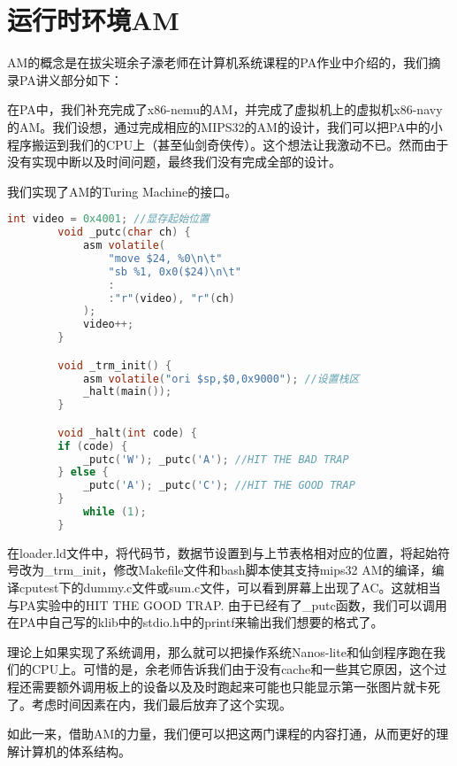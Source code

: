 \section{运行时环境AM}
    AM的概念是在拔尖班余子濠老师在计算机系统课程的PA作业中介绍的，我们摘录PA讲义部分如下：

    在PA中，我们补充完成了x86-nemu的AM，并完成了虚拟机上的虚拟机x86-navy的AM。我们设想，通过完成相应的MIPS32的AM的设计，我们可以把PA中的小程序搬运到我们的CPU上（甚至仙剑奇侠传）。这个想法让我激动不已。然而由于没有实现中断以及时间问题，最终我们没有完成全部的设计。

    我们实现了AM的Turing Machine的接口。
    \begin{lstlisting}[language=C]
        int video = 0x4001; //显存起始位置
        void _putc(char ch) {
            asm volatile(
                "move $24, %0\n\t"
                "sb %1, 0x0($24)\n\t"
                :
                :"r"(video), "r"(ch)
            );
            video++;
        }

        void _trm_init() {
            asm volatile("ori $sp,$0,0x9000"); //设置栈区
            _halt(main());
        }

        void _halt(int code) {
        if (code) {
            _putc('W'); _putc('A'); //HIT THE BAD TRAP
        } else {
            _putc('A'); _putc('C'); //HIT THE GOOD TRAP
        }
            while (1);
        }
    \end{lstlisting}

    在loader.ld文件中，将代码节，数据节设置到与上节表格相对应的位置，将起始符号改为\_trm\_init，修改Makefile文件和bash脚本使其支持mips32 AM的编译，编译cputest下的dummy.c文件或sum.c文件，可以看到屏幕上出现了AC。这就相当与PA实验中的HIT THE GOOD TRAP. 由于已经有了\_putc函数，我们可以调用在PA中自己写的klib中的stdio.h中的printf来输出我们想要的格式了。
    
    理论上如果实现了系统调用，那么就可以把操作系统Nanos-lite和仙剑程序跑在我们的CPU上。可惜的是，余老师告诉我们由于没有cache和一些其它原因，这个过程还需要额外调用板上的设备以及及时跑起来可能也只能显示第一张图片就卡死了。考虑时间因素在内，我们最后放弃了这个实现。

    如此一来，借助AM的力量，我们便可以把这两门课程的内容打通，从而更好的理解计算机的体系结构。

